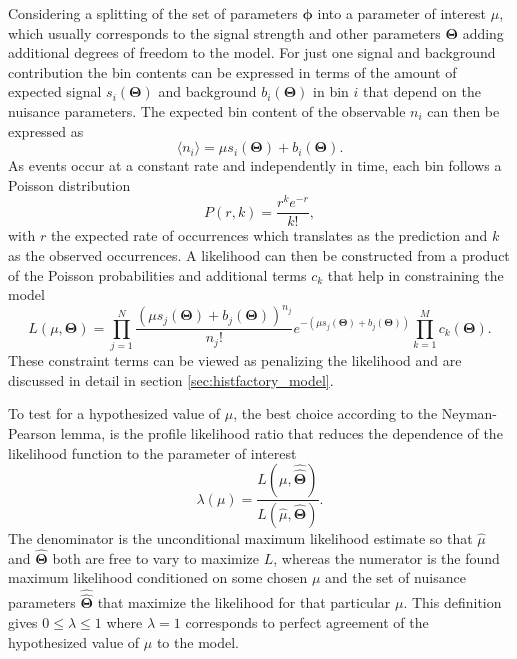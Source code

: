 Considering a splitting of the set of parameters $\bm{\phi}$ into a parameter of interest $\mu$, which usually corresponds to the signal strength and other parameters $\bm{\Theta}$ adding additional degrees of freedom to the model. For just one signal and background contribution the bin contents can be expressed in terms of the amount of expected signal $s_i(\bm{\Theta})$ and background $b_i(\bm{\Theta})$ in bin $i$ that depend on the nuisance parameters. The expected bin content of the observable $n_i$ can then be expressed as
\begin{equation} \label{eq:n_i}
    \langle n_i\rangle = \mu s_i(\bm{\Theta}) +b_i(\bm{\Theta}).
\end{equation}
As events occur at a constant rate and independently in time, each bin follows a Poisson distribution
\begin{equation}\label{eq:poisson}
    P(r,k)=\frac{r^k e^{-r}}{k!},
\end{equation}
with $r$ the expected rate of occurrences which translates as the prediction and $k$ as the observed occurrences. A likelihood can then be constructed from a product of the Poisson probabilities and additional terms $c_k$ that help in constraining the model
\begin{equation}\label{eq:likelihood}
    L(\mu,\bm{\Theta})=
    \prod_{j=1}^N \frac{(\mu s_j(\bm{\Theta}) + b_j(\bm{\Theta}))^{n_j}}{n_j !} e^{-(\mu s_j(\bm{\Theta}) + b_j(\bm{\Theta}))}
    \prod_{k=1}^M c_k(\bm{\Theta}).
\end{equation}
These constraint terms can be viewed as penalizing the likelihood and are discussed in detail in section \ref{sec:histfactory_model}.

To test for a hypothesized value of $\mu$, the best choice according to the Neyman-Pearson lemma, is the profile likelihood ratio that reduces the dependence of the likelihood function to the parameter of interest
\begin{equation}\label{eq:likelihood_ratio}
    \lambda(\mu)=
    \frac{L(\mu,\hat{\hat{\bm{\Theta}}})}
    {L(\hat{\mu},\hat{\bm{\Theta}})}.
\end{equation}
The denominator is the unconditional maximum likelihood estimate so that $\hat{\mu}$ and $\hat{\bm{\Theta}}$ both are free to vary to maximize $L$, whereas the numerator is the found maximum likelihood conditioned on some chosen $\mu$ and the set of nuisance parameters $\hat{\hat{\bm{\Theta}}}$ that maximize the likelihood for that particular $\mu$. This definition gives $0 \leq \lambda \leq 1$ where $\lambda = 1$ corresponds to perfect agreement of the hypothesized value of $\mu$ to the model.


